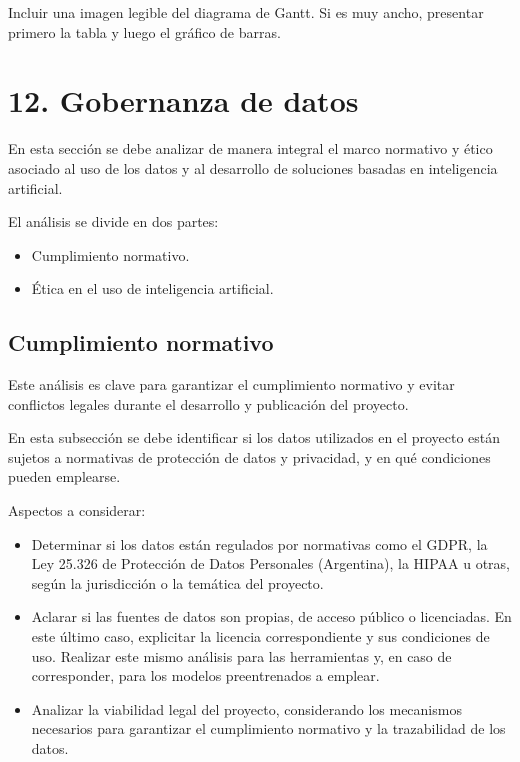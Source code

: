 \documentclass[
11pt, %
]{charter}
\begin{document}
Incluir una imagen legible del diagrama de Gantt. Si es muy ancho, presentar primero la tabla y luego el gráfico de barras.



\section{12. Gobernanza de datos}
\label{sec:gobernanza}

En esta sección se debe analizar de manera integral el marco normativo y ético asociado al uso de los datos y al desarrollo de soluciones basadas en inteligencia artificial.

El análisis se divide en dos partes:

\begin{itemize}
  \item Cumplimiento normativo.
  \item Ética en el uso de inteligencia artificial.
\end{itemize}

\subsection{Cumplimiento normativo}
Este análisis es clave para garantizar el cumplimiento normativo y evitar conflictos legales durante el desarrollo y publicación del proyecto.

En esta subsección se debe identificar si los datos utilizados en el proyecto están sujetos a normativas de protección de datos y privacidad, y en qué condiciones pueden emplearse.

Aspectos a considerar:

\begin{itemize}
  \item Determinar si los datos están regulados por normativas como el GDPR, la Ley 25.326 de Protección de Datos Personales (Argentina), la HIPAA u otras, según la jurisdicción o la temática del proyecto.
  \item Aclarar si las fuentes de datos son propias, de acceso público o licenciadas. En este último caso, explicitar la licencia correspondiente y sus condiciones de uso. Realizar este mismo análisis para las herramientas y, en caso de corresponder, para los modelos preentrenados a emplear.
  \item Analizar la viabilidad legal del proyecto, considerando los mecanismos necesarios para garantizar el cumplimiento normativo y la trazabilidad de los datos.
\end{itemize}
\end{document}
